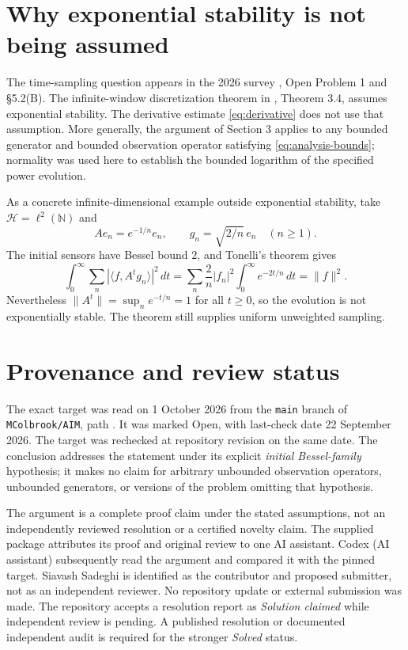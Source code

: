 \documentclass[11pt]{article}
\newcommand{\HH}{\mathcal H}
\newcommand{\NN}{\mathbb N}
\begin{document}
\section{Why exponential stability is not being assumed}
The time-sampling question appears in the 2026 survey \cite{survey}, Open Problem 1 and \S5.2(B). The infinite-window discretization theorem in \cite{dmm}, Theorem 3.4, assumes exponential stability. The derivative estimate \eqref{eq:derivative} does not use that assumption. More generally, the argument of Section 3 applies to any bounded generator and bounded observation operator satisfying \eqref{eq:analysis-bounds}; normality was used here to establish the bounded logarithm of the specified power evolution.

As a concrete infinite-dimensional example outside exponential stability, take $\HH=\ell^2(\NN)$ and
\[
Ae_n=e^{-1/n}e_n,\qquad g_n=\sqrt{2/n}\,e_n\quad(n\geq1).
\]
The initial sensors have Bessel bound $2$, and Tonelli's theorem gives
\[
\int_0^\infty\sum_n|\langle f,A^tg_n\rangle|^2\,dt
=\sum_n\frac2n|f_n|^2\int_0^\infty e^{-2t/n}\,dt=\|f\|^2.
\]
Nevertheless $\|A^t\|=\sup_n e^{-t/n}=1$ for all $t\geq0$, so the evolution is not exponentially stable. The theorem still supplies uniform unweighted sampling.

\section{Provenance and review status}
The exact target was read on 1 October 2026 from the \texttt{main} branch of \texttt{MColbrook/AIM}, path . It was marked Open, with last-check date 22 September 2026. The target was rechecked at repository revision  on the same date. The conclusion addresses the statement under its explicit \emph{initial Bessel-family} hypothesis; it makes no claim for arbitrary unbounded observation operators, unbounded generators, or versions of the problem omitting that hypothesis.

The argument is a complete proof claim under the stated assumptions, not an independently reviewed resolution or a certified novelty claim. The supplied package attributes its proof and original review to one AI assistant. Codex (AI assistant) subsequently read the argument and compared it with the pinned target. Siavash Sadeghi is identified as the contributor and proposed submitter, not as an independent reviewer. No repository update or external submission was made. The repository accepts a resolution report as \emph{Solution claimed} while independent review is pending. A published resolution or documented independent audit is required for the stronger \emph{Solved} status.
\end{document}
